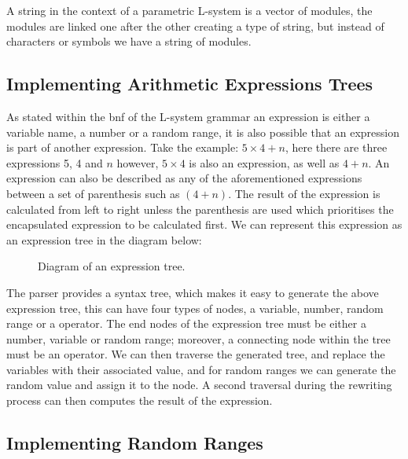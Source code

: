 A string in the context of a parametric L-system is a vector of modules, the modules are linked one after the other creating a type of string, but instead of characters or symbols we have a string of modules.

\subsection{Implementing Arithmetic Expressions Trees}

As stated within the \acrshort{bnf} of the L-system grammar an expression is either a variable name, a number or a random range, it is also possible that an expression is part of another expression. Take the example: $5 \times 4 + n$, here there are three expressions 5, 4 and $n$ however, $5 \times 4$ is also an expression, as well as $4 + n$. An expression can also be described as any of the aforementioned expressions between a set of parenthesis such as $(4+n)$. The result of the expression is calculated from left to right unless the parenthesis are used which prioritises the encapsulated expression to be calculated first. We can represent this expression as an expression tree in the diagram below:


\begin{figure}[htbp]
	{\centering
		\setlength{\fboxrule}{1pt}
		\vspace{7px}
		\caption{Diagram of an expression tree.} \label{3D rotations}
	}
\end{figure}
\FloatBarrier

The parser provides a syntax tree, which makes it easy to generate the above expression tree, this can have four types of nodes, a variable, number, random range or a operator. The end nodes of the expression tree must be either a number, variable or random range; moreover, a connecting node within the tree must be an operator. We can then traverse the generated tree, and replace the variables with their associated value, and for random ranges we can generate the random value and assign it to the node. A second traversal during the rewriting process can then computes the result of the expression. 

\subsection{Implementing Random Ranges}

